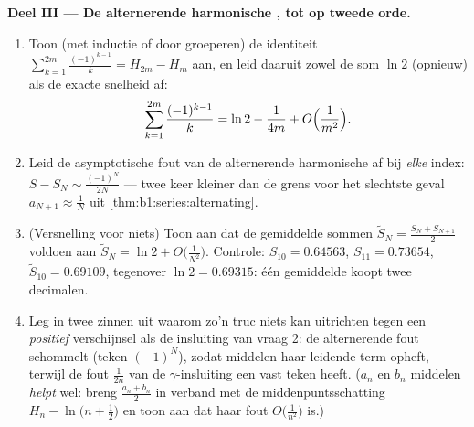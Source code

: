 \begin{problem}[{Weekendopgave --- $H_n = \ln n + \gamma +
\frac{1}{2n} + O(n^{-2})$, en het herschikken van $1 - \frac12 +
\frac13 - \dots$ tot $\frac{\ln 2}{2}$}]
\medskip
\noindent\textbf{Deel III --- De alternerende harmonische ,
tot op tweede orde.}
\begin{enumerate}[resume]
  \item Toon (met inductie of door groeperen) de identiteit
        $\sum_{k=1}^{2m} \frac{(-1)^{k-1}}{k} = H_{2m} - H_m$ aan,
        en leid daaruit zowel de som $\ln 2$ (opnieuw) als de
        exacte snelheid af:
        \[
        \sum_{k=1}^{2m} \frac{(-1)^{k-1}}{k}
        = \ln 2 - \frac{1}{4m} + O\Bigl(\frac{1}{m^2}\Bigr) .
        \]
  \item Leid de asymptotische fout van de alternerende harmonische
         af bij \emph{elke} index: $S - S_N \sim
        \frac{(-1)^N}{2N}$ --- twee keer kleiner dan de grens voor
        het slechtste geval $a_{N+1} \approx \frac1N$ uit
        \cref{thm:b1:series:alternating}.
  \item (Versnelling voor niets) Toon aan dat de gemiddelde sommen
        $\tilde S_N = \frac{S_N + S_{N+1}}{2}$ voldoen aan $\tilde
        S_N = \ln 2 + O\bigl(\frac{1}{N^2}\bigr)$. Controle:
        $S_{10} = 0.64563$, $S_{11} = 0.73654$, $\tilde S_{10} =
        0.69109$, tegenover $\ln 2 = 0.69315$: één gemiddelde
        koopt twee decimalen.
  \item Leg in twee zinnen uit waarom zo'n truc niets kan
        uitrichten tegen een \emph{positief} verschijnsel als de
        insluiting van vraag 2: de alternerende fout schommelt
        (teken $(-1)^N$), zodat middelen haar leidende term
        opheft, terwijl de fout $\frac{1}{2n}$ van de
        $\gamma$-insluiting een vast teken heeft. ($a_n$ en $b_n$
        middelen \emph{helpt} wel: breng $\frac{a_n + b_n}{2}$ in
        verband met de middenpuntsschatting $H_n - \ln\bigl(n +
        \frac12\bigr)$ en toon aan dat haar fout
        $O\bigl(\frac{1}{n^2}\bigr)$ is.)
\end{enumerate}


\end{problem}
